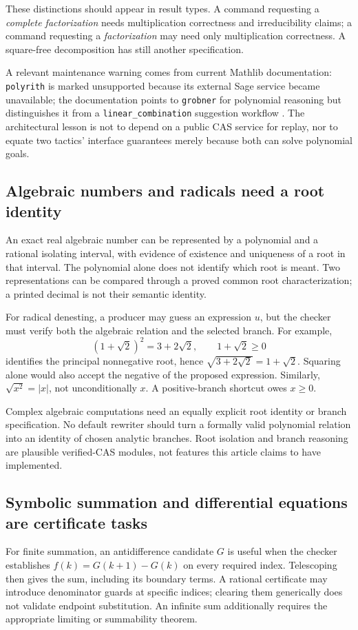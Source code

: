 \documentclass[11pt,letterpaper]{article}
\newcommand{\code}[1]{\nolinkurl{#1}}
\theoremstyle{definition}
\begin{document}
These distinctions should appear in result types. A command requesting a
\emph{complete factorization} needs multiplication correctness and irreducibility
claims; a command requesting a \emph{factorization} may need only multiplication
correctness. A square-free decomposition has still another specification.

A relevant maintenance warning comes from current Mathlib documentation:
\code{polyrith} is marked unsupported because its external Sage service became
unavailable; the documentation points to \code{grobner} for polynomial reasoning
but distinguishes it from a \code{linear_combination} suggestion workflow
\cite{polyrith}. The architectural lesson is not to depend on a public CAS service
for replay, nor to equate two tactics' interface guarantees merely because both
can solve polynomial goals.

\subsection{Algebraic numbers and radicals need a root identity}
An exact real algebraic number can be represented by a polynomial and a rational
isolating interval, with evidence of existence and uniqueness of a root in that
interval. The polynomial alone does not identify which root is meant. Two
representations can be compared through a proved common root characterization;
a printed decimal is not their semantic identity.

For radical denesting, a producer may guess an expression \(u\), but the checker
must verify both the algebraic relation and the selected branch. For example,
\[
 (1+\sqrt2)^2=3+2\sqrt2,\qquad 1+\sqrt2\ge0
\]
identifies the principal nonnegative root, hence
\(\sqrt{3+2\sqrt2}=1+\sqrt2\). Squaring alone would also accept the negative
of the proposed expression. Similarly, \(\sqrt{x^2}=|x|\), not unconditionally
\(x\). A positive-branch shortcut owes \(x\ge0\).

Complex algebraic computations need an equally explicit root identity or branch
specification. No default rewriter should turn a formally valid polynomial relation
into an identity of chosen analytic branches. Root isolation and branch reasoning
are plausible verified-CAS modules, not features this article claims to have
implemented.

\subsection{Symbolic summation and differential equations are certificate tasks}
For finite summation, an antidifference candidate \(G\) is useful when the checker
establishes \(f(k)=G(k+1)-G(k)\) on every required index. Telescoping then gives the
sum, including its boundary terms. A rational certificate may introduce denominator
guards at specific indices; clearing them generically does not validate endpoint
substitution. An infinite sum additionally requires the appropriate limiting or
summability theorem.
\end{document}
